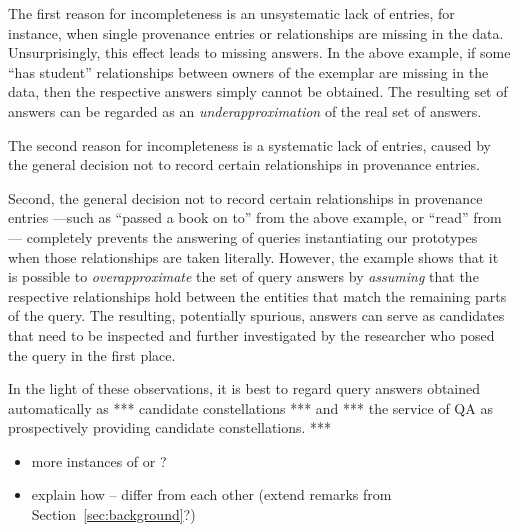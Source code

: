 The first reason for incompleteness is an unsystematic lack of entries,
for instance, when single provenance entries or relationships are missing in the data.
Unsurprisingly, this effect leads to missing answers.
In the above example, if some \enquote{has student} relationships
between owners of the exemplar are missing in the data, then the respective answers
simply cannot be obtained. The resulting set of answers can be regarded as
an \emph{underapproximation} of the real set of answers.

The second reason for incompleteness is a systematic lack of entries,
caused by the general decision not to record certain relationships in provenance entries.

Second, the general decision not to record certain relationships in provenance entries%
---such as \enquote{passed a book on to} from
the above example, or \enquote{read} from ---%
completely prevents the answering of queries instantiating our prototypes when
those relationships are taken literally.
However, the example shows that it is possible to \emph{overapproximate}
the set of query answers by \emph{assuming} that the respective relationships hold
between the entities that match the remaining parts of the query.
The resulting, potentially spurious, answers can serve as candidates
that need to be inspected and further investigated by the researcher who
posed the query in the first place.


In the light of these observations,
it is best to regard query answers obtained automatically
as *** candidate constellations *** and *** the service of QA as prospectively providing
candidate constellations. ***






%
\begin{itemize}
  \item
    more instances of  or ?
  \item
    explain how -- differ from each other (extend remarks from Section~\ref{sec:background}?)
\end{itemize}
